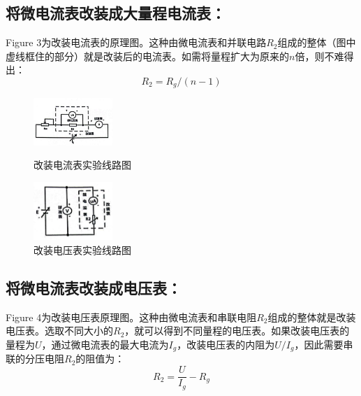 \documentclass{article}
\begin{document}
\subsection{将微电流表改装成大量程电流表：}
\hspace*{2em}Figure 3为改装电流表的原理图。这种由微电流表和并联电路$R_2$组成的整体（图中虚线框住的部分）就是改装后的电流表。如需将量程扩大为原来的$n$倍，则不难得出：
$$
R_2=R_g/(n-1)
$$
\begin{figure}[ht]
    \centering
    \begin{minipage}{0.45\textwidth} %
        \centering
        \includegraphics[width=3cm]{1.3.png} %
        \caption{改装电流表实验线路图}
    \end{minipage}\hfill
    \begin{minipage}{0.45\textwidth}
        \centering
        \includegraphics[width=3cm]{1.4.png} %
        \caption{改装电压表实验线路图}
    \end{minipage}
\end{figure}
\subsection{将微电流表改装成电压表：}
\hspace*{2em}Figure 4为改装电压表原理图。这种由微电流表和串联电阻$R_2$组成的整体就是改装电压表。选取不同大小的$R_2$，就可以得到不同量程的电压表。如果改装电压表的量程为$U$，通过微电流表的最大电流为$I_g$，改装电压表的内阻为$U/I_g$，因此需要串联的分压电阻$R_2$的阻值为：
$$
R_2=\frac{U}{I_g}-R_g
$$ 
\end{document}

